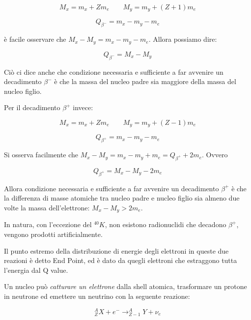 \begin{equation}
M_x=m_x+Zm_e 	\qquad M_y=m_y+(Z+1)m_e
\end{equation}

\begin{equation}
Q_{\beta^-}=m_x-m_y-m_e
\end{equation}

è facile osservare che $M_x-M_y=m_x-m_y-m_e$. Allora possiamo dire:

\begin{equation}
Q_{\beta^-}=M_x-M_y
\end{equation}

Ciò ci dice anche che condizione necessaria e sufficiente a far avvenire un decadimento $\beta^-$ è che la massa del nucleo padre sia maggiore della massa del nucleo figlio.

Per il decadimento $\beta^+$ invece:

\begin{equation}
M_x=m_x+Zm_e \qquad M_y=m_y+(Z-1)m_e
\end{equation}

\begin{equation}
Q_{\beta^+}=m_x-m_y-m_e
\end{equation}

Si osserva facilmente che $M_x-M_y=m_x-m_y+m_e=Q_{\beta^+}+2m_e$.
Ovvero

\begin{equation}
Q_{\beta^+}=M_x-M_y-2m_e
\end{equation}

Allora condizione necessaria e sufficiente a far avvenire un decadimento $\beta^+$ è che la differenza di masse atomiche tra nucleo padre e nucleo figlio sia almeno due volte la massa dell'elettrone: $M_x-M_y>2m_e$.

In natura, con l'eccezione del $^{40}K$, non esistono radionuclidi che decadono $\beta^+$, vengono prodotti artificialmente.

Il punto estremo della distribuzione di energie degli elettroni in queste due reazioni è detto End Point, ed è dato da quegli elettroni che estraggono tutta l'energia dal Q value.

Un nucleo può \emph{catturare un elettrone} dalla shell atomica, trasformare un protone in neutrone ed emettere un neutrino con la seguente reazione:

\begin{equation}
^A_ZX+e^- \longrightarrow _{Z-1}^AY+\nu_e
\end{equation}

